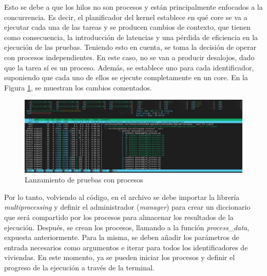 \vspace{3mm}

Esto se debe a que los hilos no son procesos y están principalmente enfocados a la concurrencia. Es decir, el planificador del kernel establece en qué core se va a ejecutar cada una de las tareas y se producen cambios de contexto, que tienen como consecuencia, la introducción de latencias y una pérdida de eficiencia en la ejecución de las pruebas. Teniendo esto en cuenta, se toma la decisión de operar con procesos independientes. En este caso, no se van a producir desalojos, dado que la tarea sí es un proceso. Además, se establece uno para cada identificador, suponiendo que cada uno de ellos se ejecute completamente en un core. En la Figura \ref{fig:multiprocess}, se muestran los cambios comentados. \cite{thread}

\vspace{3mm}

\begin{figure}[h!]
  \centering
  \includegraphics[width=1\textwidth]{img/diseno/multiprocess.jpg}
  \caption{Lanzamiento de pruebas con procesos}
  \label{fig:multiprocess}
\end{figure}

\vspace{3mm}

Por lo tanto, volviendo al código, en el archivo se debe importar la librería \textit{multiprocessing} y definir el administrador (\textit{manager}) para crear un diccionario que será compartido por los procesos para almacenar los resultados de la ejecución. Después, se crean los procesos, llamando a la función \textit{process\_data}, expuesta anteriormente. Para la misma, se deben añadir los parámetros de entrada necesarios como argumentos e iterar para todos los identificadores de viviendas. En este momento, ya se pueden iniciar los procesos y definir el progreso de la ejecución a través de la terminal. 

\vspace{3mm}

